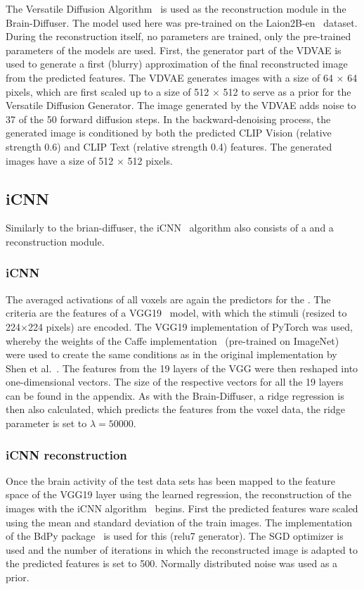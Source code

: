 The Versatile Diffusion Algorithm~\cite{xuVersatileDiffusionText2024} is used as the reconstruction module in the Brain-Diffuser. The model used here was pre-trained on the Laion2B-en~\cite{schuhmannLAION400MOpenDataset2021} dataset. During the reconstruction itself, no parameters are trained, only the pre-trained parameters of the models are used. First, the generator part of the VDVAE is used to generate a first (blurry) approximation of the final reconstructed image from the predicted features. The VDVAE generates images with a size of 64 $\times$ 64 pixels, which are first scaled up to a size of 512 $\times$ 512 to serve as a prior for the Versatile Diffusion Generator. The image generated by the VDVAE adds noise to 37 of the 50 forward diffusion steps. In the backward-denoising process, the generated image is conditioned by both the predicted CLIP Vision (relative strength 0.6) and CLIP Text (relative strength 0.4) features. The generated images have a size of 512 $\times$ 512 pixels. 

\subsection{iCNN}
Similarly to the brian-diffuser, the iCNN~\cite{shenDeepImageReconstruction2019} algorithm also consists of a  and a reconstruction module. 
\subsubsection{iCNN }
The averaged activations of all voxels are again the predictors for the . The criteria are the features of a VGG19~\cite{simonyanVeryDeepConvolutional2014} model, with which the stimuli (resized to 224$\times$224 pixels) are encoded. The VGG19 implementation of PyTorch was used, whereby the weights of the Caffe implementation~\cite{ModelZoo} (pre-trained on ImageNet) were used to create the same conditions as in the original implementation by Shen et al.~\cite{shenDeepImageReconstruction2019}. The features from the 19 layers of the VGG were then reshaped into one-dimensional vectors. The size of the respective vectors for all the 19 layers can be found in the appendix. As with the Brain-Diffuser, a ridge regression is then also calculated, which predicts the features from the voxel data, the ridge parameter is set to $\lambda=50000$.

\subsubsection{iCNN reconstruction}
Once the brain activity of the test data sets has been mapped to the feature space of the VGG19 layer using the learned regression, the reconstruction of the images with the iCNN algorithm~\cite{shenDeepImageReconstruction2019} begins. First the predicted features ware scaled using the mean and standard deviation of the train images. The implementation of the BdPy package~\cite{KamitaniLabBdpy2024} is used for this (relu7 generator). The SGD optimizer is used and the number of iterations in which the reconstructed image is adapted to the predicted features is set to 500. Normally distributed noise was used as a prior.


